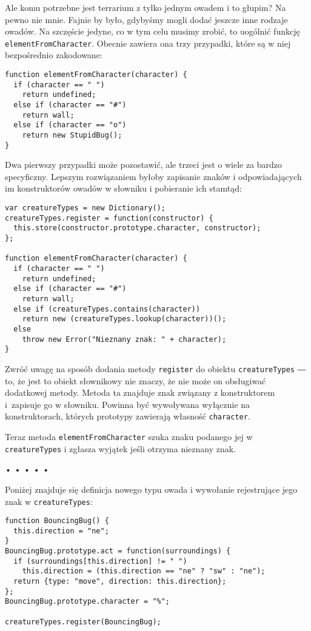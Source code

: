   
Ale komu potrzebne jest terrarium z tylko jednym owadem i to głupim? Na pewno nie mnie. Fajnie by było, gdybyśmy mogli dodać jeszcze inne rodzaje owadów. Na szczęście jedyne, co w tym celu musimy zrobić, to uogólnić funkcję \texttt{elementFromCharacter}. Obecnie zawiera ona trzy przypadki, które są w niej bezpośrednio zakodowane:

  
\begin{verbatim} 
function elementFromCharacter(character) {
  if (character == " ")
    return undefined;
  else if (character == "#")
    return wall;
  else if (character == "o")
    return new StupidBug();
}
 \end{verbatim}
  
Dwa pierwszy przypadki może pozostawić, ale trzeci jest o wiele za bardzo specyficzny. Lepszym rozwiązaniem byłoby zapisanie znaków i odpowiadających im konstruktorów owadów w słowniku i pobieranie ich stamtąd:

  
\begin{verbatim} 
var creatureTypes = new Dictionary();
creatureTypes.register = function(constructor) {
  this.store(constructor.prototype.character, constructor);
};

function elementFromCharacter(character) {
  if (character == " ")
    return undefined;
  else if (character == "#")
    return wall;
  else if (creatureTypes.contains(character))
    return new (creatureTypes.lookup(character))();
  else
    throw new Error("Nieznany znak: " + character);
}
 \end{verbatim}
  
Zwróć uwagę na sposób dodania metody \texttt{register} do obiektu \texttt{creatureTypes} ― to, że jest to obiekt słownikowy nie znaczy, że nie może on obsługiwać dodatkowej metody. Metoda ta znajduje znak związany z konstruktorem i~zapisuje go w słowniku. Powinna być wywoływana wyłącznie na konstruktorach, których prototypy zawierają własność \texttt{character}.

  
Teraz metoda \texttt{elementFromCharacter} szuka znaku podanego jej w \texttt{creatureTypes} i zgłasza wyjątek jeśli otrzyma nieznany znak.



\begin{center}
• • • • •
\end{center}

  
Poniżej znajduje się definicja nowego typu owada i wywołanie rejestrujące jego znak w \texttt{creatureTypes}:

  
\begin{verbatim} 
function BouncingBug() {
  this.direction = "ne";
}
BouncingBug.prototype.act = function(surroundings) {
  if (surroundings[this.direction] != " ")
    this.direction = (this.direction == "ne" ? "sw" : "ne");
  return {type: "move", direction: this.direction};
};
BouncingBug.prototype.character = "%";

creatureTypes.register(BouncingBug);
 \end{verbatim}
  
